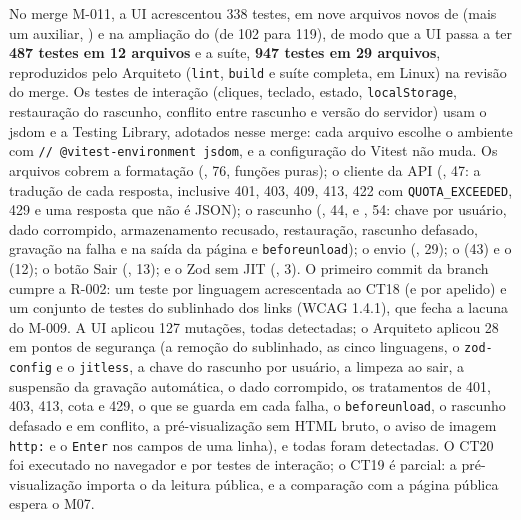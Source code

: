 No merge M-011, a UI acrescentou 338 testes, em nove arquivos novos de  (mais um auxiliar, ) e na ampliação do  (de 102 para 119), de modo que a UI passa a ter \textbf{487 testes em 12 arquivos} e a suíte, \textbf{947 testes em 29 arquivos}, reproduzidos pelo Arquiteto (\texttt{lint}, \texttt{build} e suíte completa, em Linux) na revisão do merge. Os testes de interação (cliques, teclado, estado, \texttt{localStorage}, restauração do rascunho, conflito entre rascunho e versão do servidor) usam o jsdom e a Testing Library, adotados nesse merge: cada arquivo escolhe o ambiente com \texttt{// @vitest-environment jsdom}, e a configuração do Vitest não muda. Os arquivos cobrem a formatação (, 76, funções puras); o cliente da API (, 47: a tradução de cada resposta, inclusive 401, 403, 409, 413, 422 com \texttt{QUOTA\_EXCEEDED}, 429 e uma resposta que não é JSON); o rascunho (, 44, e , 54: chave por usuário, dado corrompido, armazenamento recusado, restauração, rascunho defasado, gravação na falha e na saída da página e \texttt{beforeunload}); o envio (, 29); o  (43) e o  (12); o botão Sair (, 13); e o Zod sem JIT (, 3). O primeiro commit da branch cumpre a R-002: um teste por linguagem acrescentada ao CT18 (e por apelido) e um conjunto de testes do sublinhado dos links (WCAG 1.4.1), que fecha a lacuna do M-009. A UI aplicou 127 mutações, todas detectadas; o Arquiteto aplicou 28 em pontos de segurança (a remoção do sublinhado, as cinco linguagens, o \texttt{zod-config} e o \texttt{jitless}, a chave do rascunho por usuário, a limpeza ao sair, a suspensão da gravação automática, o dado corrompido, os tratamentos de 401, 403, 413, cota e 429, o que se guarda em cada falha, o \texttt{beforeunload}, o rascunho defasado e em conflito, a pré-visualização sem HTML bruto, o aviso de imagem \texttt{http:} e o \texttt{Enter} nos campos de uma linha), e todas foram detectadas. O CT20 foi executado no navegador e por testes de interação; o CT19 é parcial: a pré-visualização importa o  da leitura pública, e a comparação com a página pública espera o M07.


